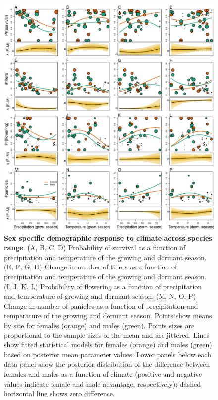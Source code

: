 \documentclass[12pt]{article}
\begin{document}
\begin{figure}[H]
  \begin{center}
    \includegraphics[width=0.80\linewidth]{Figures/vital_rates.pdf}
  \caption{\textbf{Sex specific demographic response to climate across species range}.
  (A, B, C, D) Probability of survival as a function of precipitation and temperature of the growing and dormant season.
  (E, F, G, H) Change in number of tillers as a function of precipitation and temperature of the growing and dormant season.
  (I, J, K, L) Probability of flowering as a function of precipitation and temperature of growing and dormant season.
  (M, N, O, P) Change in number of panicles as a function of precipitation and temperature of the growing and dormant season.
  Points show means by site for females (orange) and males (green). 
  Points sizes are proportional to the sample sizes of the mean and are jittered.
  Lines show fitted statistical models for females (orange) and males (green) based on posterior mean parameter values.
  Lower panels below each data panel show the posterior distribution of the difference between females and males as a function of climate (positive and negative values indicate female and male advantage, respectively); dashed horizontal line shows zero difference.
  }
  \label{fig:vital_rates}
  \end{center}
\end{figure}
\end{document}
